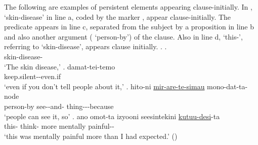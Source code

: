 The following are examples of persistent elements appearing clause-initially.
In \Next,
 `skin-disease' in line a, coded by the  marker ,
appear clause-initially.
The predicate appears in line c,
separated from the subject by a proposition in line b and also another argument ( `person-by') of the clause.
Also in line d,  `this-', referring to `skin-disease', appears clause initially.
%
\ex.
 \ag.  \\
 		skin-disease- \\
		`The skin disease,'
 \bg. damat-tei-temo \\
 		keep.silent--even.if \\
		`even if you don't tell people about it,'
 \bg. hito-ni \ul{mir-are-te-simau} mono-dat-ta-node \\
 		person-by see--and- thing---because \\
		`people can see it, so'
 \bg.  ano omot-ta izyooni seesintekini \ul{kutuu-desi}-ta \\
 		this-  think- more mentally painful-- \\
		`this was mentally painful more than I had expected.'
		\hfill{()}

